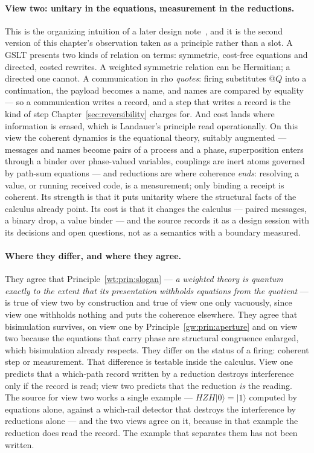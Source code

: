 \paragraph{View two: unitary in the equations, measurement in the reductions.}
This is the organizing intuition of a later design note~\cite{UnitaryEq},
and it is the second version of this chapter's observation taken as a
principle rather than a slot.  A GSLT presents two kinds of relation on
terms: symmetric, cost-free equations and directed, costed rewrites.  A
weighted symmetric relation can be Hermitian; a directed one cannot.  A
communication in rho \emph{quotes}: firing substitutes $@Q$ into a
continuation, the payload becomes a name, and names are compared by
equality --- so a communication writes a record, and a step that writes a
record is the kind of step Chapter~\ref{sec:reversibility} charges for.
And cost lands where information is erased, which is Landauer's principle
read operationally.  On this view the coherent dynamics is the equational
theory, suitably augmented --- messages and names become pairs of a process
and a phase, superposition enters through a binder over phase-valued
variables, couplings are inert atoms governed by path-sum equations --- and
reductions are where coherence \emph{ends}: resolving a value, or running
received code, is a measurement; only binding a receipt is coherent.  Its
strength is that it puts unitarity where the structural facts of the
calculus already point.  Its cost is that it changes the calculus ---
paired messages, a binary drop, a value binder --- and the source records it
as a design session with its decisions and open questions, not as a
semantics with a boundary measured.

\paragraph{Where they differ, and where they agree.}
They agree that Principle~\ref{wt:prin:slogan} --- \emph{a weighted theory
is quantum exactly to the extent that its presentation withholds equations
from the quotient} --- is true of view two by construction and true of view
one only vacuously, since view one withholds nothing and puts the coherence
elsewhere.  They agree that bisimulation survives, on view one by
Principle~\ref{gw:prin:aperture} and on view two because the equations that
carry phase are structural congruence enlarged, which bisimulation already
respects.  They differ on the status of a firing: coherent step or
measurement.  That difference is testable inside the calculus.  View one
predicts that a which-path record written by a reduction destroys
interference only if the record is read; view two predicts that the
reduction \emph{is} the reading.  The source for view two works a single
example --- $HZH\lvert 0\rangle = \lvert 1\rangle$ computed by equations
alone, against a which-rail detector that destroys the interference by
reductions alone --- and the two views agree on it, because in that example
the reduction does read the record.  The example that separates them has
not been written.

